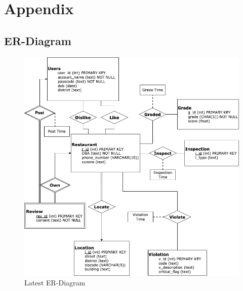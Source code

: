 \documentclass[a4paper,12pt]{article}
\theoremstyle{definition}
\begin{document}
\newpage
\section{Appendix}
\subsection{ER-Diagram}
\begin{figure}[h]
    \centering
    \includegraphics[scale=0.5]{Project1_ER.drawio.png}
    \caption{Latest ER-Diagram}
    \label{fig:er}
\end{figure}

\newpage
\end{document}
